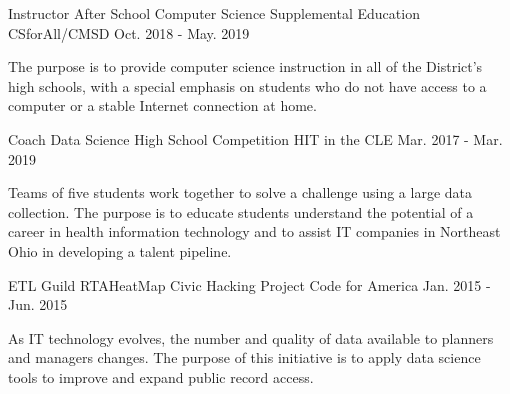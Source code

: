 
\begin{cventries}

  \cventry
    {Instructor} %
    {After School Computer Science Supplemental Education} %
    {CSforAll/CMSD} %
    {Oct. 2018 - May. 2019} %
    {
      \begin{cvcompactparagraph}
        The purpose is to provide computer science instruction in all of the District's high schools, with a special emphasis on students who do not have access to a computer or a stable Internet connection at home.
      \end{cvcompactparagraph}
    }

  \cventry
    {Coach} %
    {Data Science High School Competition} %
    {HIT in the CLE} %
    {Mar. 2017 - Mar. 2019} %
    {
      \begin{cvcompactparagraph}
        Teams of five students work together to solve a challenge using a large data collection. The purpose is to educate students understand the potential of a career in health information technology and to assist IT companies in Northeast Ohio in developing a talent pipeline.
      \end{cvcompactparagraph}
    }

  \cventry
    {ETL Guild} %
    {RTAHeatMap Civic Hacking Project} %
    {Code for America} %
    {Jan. 2015 - Jun. 2015} %
    {
      \begin{cvcompactparagraph}
        As IT technology evolves, the number and quality of data available to planners and managers changes. The purpose of this initiative is to apply data science tools to improve and expand public record access.
      \end{cvcompactparagraph}
    }


\end{cventries}
